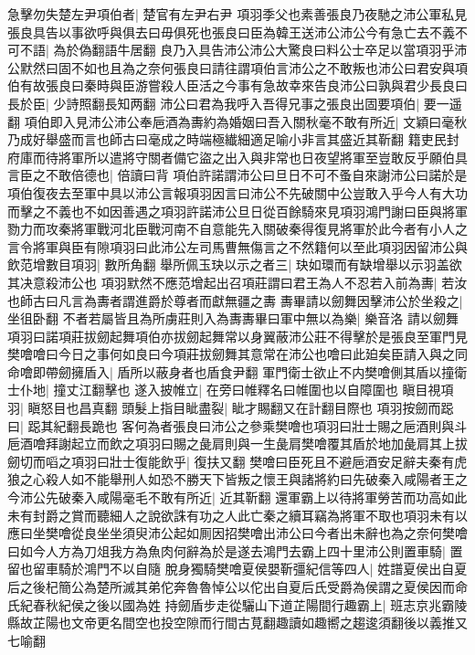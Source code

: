急擊勿失楚左尹項伯者|{
	楚官有左尹右尹}
項羽季父也素善張良乃夜馳之沛公軍私見張良具告以事欲呼與俱去曰毋俱死也張良曰臣為韓王送沛公沛公今有急亡去不義不可不語|{
	為於偽翻語牛居翻}
良乃入具告沛公沛公大驚良曰料公士卒足以當項羽乎沛公默然曰固不如也且為之奈何張良曰請往謂項伯言沛公之不敢叛也沛公曰君安與項伯有故張良曰秦時與臣游嘗殺人臣活之今事有急故幸來告良沛公曰孰與君少長良曰長於臣|{
	少詩照翻長知两翻}
沛公曰君為我呼入吾得兄事之張良出固要項伯|{
	要一遥翻}
項伯即入見沛公沛公奉巵酒為夀約為婚姻曰吾入關秋毫不敢有所近|{
	文穎曰毫秋乃成好舉盛而言也師古曰毫成之時端極纎細適足喻小非言其盛近其靳翻}
籍吏民封府庫而待將軍所以遣將守關者備它盜之出入與非常也日夜望將軍至豈敢反乎願伯具言臣之不敢倍德也|{
	倍讀曰背}
項伯許諾謂沛公曰旦日不可不蚤自來謝沛公曰諾於是項伯復夜去至軍中具以沛公言報項羽因言曰沛公不先破關中公豈敢入乎今人有大功而擊之不義也不如因善遇之項羽許諾沛公旦日從百餘騎來見項羽鴻門謝曰臣與將軍勠力而攻秦將軍戰河北臣戰河南不自意能先入關破秦得復見將軍於此今者有小人之言令將軍與臣有隙項羽曰此沛公左司馬曹無傷言之不然籍何以至此項羽因留沛公與飲范增數目項羽|{
	數所角翻}
舉所佩玉玦以示之者三|{
	玦如環而有缺增舉以示羽盖欲其决意殺沛公也}
項羽默然不應范增起出召項莊謂曰君王為人不忍若入前為夀|{
	若汝也師古曰凡言為夀者謂進爵於尊者而獻無疆之夀}
夀畢請以劒舞因擊沛公於坐殺之|{
	坐徂卧翻}
不者若屬皆且為所虜莊則入為夀夀畢曰軍中無以為樂|{
	樂音洛}
請以劒舞項羽曰諾項莊拔劒起舞項伯亦拔劒起舞常以身翼蔽沛公莊不得擊於是張良至軍門見樊噲噲曰今日之事何如良曰今項莊拔劒舞其意常在沛公也噲曰此廹矣臣請入與之同命噲即帶劒擁盾入|{
	盾所以蔽身者也盾食尹翻}
軍門衛士欲止不内樊噲側其盾以撞衛士仆地|{
	撞丈江翻擊也}
遂入披帷立|{
	在旁曰帷釋名曰帷圍也以自障圍也}
瞋目視項羽|{
	瞋怒目也昌真翻}
頭髮上指目眦盡裂|{
	眦才賜翻又在計翻目際也}
項羽按劒而跽曰|{
	跽其紀翻長跪也}
客何為者張良曰沛公之參乘樊噲也項羽曰壯士賜之巵酒則與斗巵酒噲拜謝起立而飲之項羽曰賜之彘肩則與一生彘肩樊噲覆其盾於地加彘肩其上拔劒切而㗖之項羽曰壯士復能飲乎|{
	復扶又翻}
樊噲曰臣死且不避巵酒安足辭夫秦有虎狼之心殺人如不能舉刑人如恐不勝天下皆叛之懷王與諸將約曰先破秦入咸陽者王之今沛公先破秦入咸陽毫毛不敢有所近|{
	近其靳翻}
還軍霸上以待將軍勞苦而功高如此未有封爵之賞而聽細人之說欲誅有功之人此亡秦之續耳竊為將軍不取也項羽未有以應曰坐樊噲從良坐坐須臾沛公起如厠因招樊噲出沛公曰今者出未辭也為之奈何樊噲曰如今人方為刀俎我方為魚肉何辭為於是遂去鴻門去霸上四十里沛公則置車騎|{
	置留也留車騎於鴻門不以自隨}
脫身獨騎樊噲夏侯嬰靳彊紀信等四人|{
	姓譜夏侯出自夏后之後杞簡公為楚所滅其弟佗奔魯魯悼公以佗出自夏后氏受爵為侯謂之夏侯因而命氏紀春秋紀侯之後以國為姓}
持劒盾步走從驪山下道芷陽間行趣霸上|{
	班志京兆霸陵縣故芷陽也文帝更名間空也投空隙而行間古莧翻趣讀如趣嚮之趨逡須翻後以義推又七喻翻}
